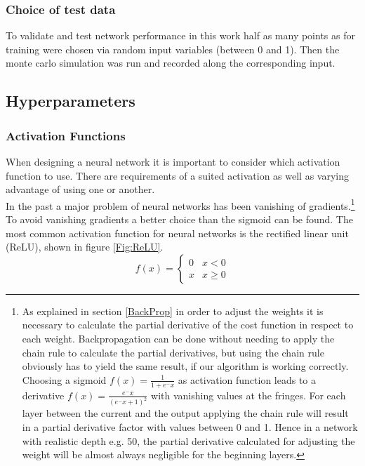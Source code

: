			\subsubsection{Choice of test data}
				To validate and test network performance in this work half as many points as for training were chosen via random input variables (between 0 and 1). Then the monte carlo simulation was run and recorded along the corresponding input.
		\subsection{Hyperparameters}
			\label{HyperPar}
			\subsubsection{Activation Functions}
				When designing a neural network it is important to consider which activation function to use. There are requirements of a suited activation as well as varying advantage of using one or another.\\
				In the past a major problem of neural networks has been vanishing of gradients.\footnote{
				As explained in section \ref{BackProp} in order to adjust the weights it is necessary to calculate the partial derivative of the cost function in respect to each weight. Backpropagation can be done without needing to apply the chain rule to calculate the partial derivatives, but using the chain rule obviously has to yield the same result, if our algorithm is working correctly.\\
				Choosing a sigmoid $f(x)=\frac{1}{1+e^-x}$ as activation function leads to a derivative $f(x)=\frac{e^-x}{(e^-x+1)^2}$ with vanishing values at the fringes. For each layer between the current and the output applying the chain rule will result in a partial derivative factor with values between 0 and 1. Hence in a network with realistic depth e.g. 50, the partial derivative calculated for adjusting the weight will be almost always negligible for the beginning layers.}\\
				To avoid vanishing gradients a better choice than the sigmoid can be found. The most common activation function for neural networks is the rectified linear unit (ReLU), shown in figure \ref{Fig:ReLU}.
				\begin{equation}
					f(x) =
					\begin{cases}
						0 & x < 0\\
						x & x \geq 0
					\end{cases}
					\label{EQ:ReLU}
				\end{equation}
